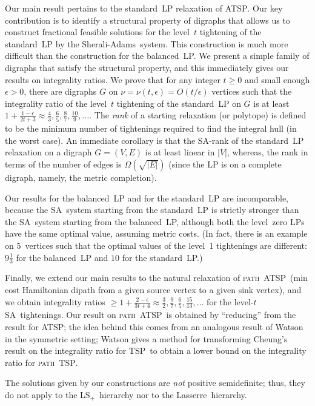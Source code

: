 \documentclass[11pt]{article}
\newcommand{\sa}{\textsf{Sherali-Adams}}
\newcommand{\la}{\textsf{Lasserre}}
\newcommand{\iLSp}{\textsf{LS}$_+$}
\newcommand{\iSA}{\textsf{SA}}
\newcommand{\tsp}{\textsc{TSP}}
\newcommand{\atsp}{\textsc{ATSP}}
\newcommand{\pathtsp}{\textsc{path~TSP}}
\newcommand{\pathatsp}{\textsc{path~ATSP}}
\begin{document}
Our main result pertains to the standard~LP relaxation of \atsp.
Our key contribution is to identify
a structural property of digraphs that
allows us to construct fractional feasible solutions
for the level~$t$ tightening of the standard~LP by the \sa\ system.
This construction is much more difficult than the
construction for the balanced~LP.
We present a simple family of digraphs that
satisfy the structural property, and this immediately
gives our results on integrality ratios.
We prove that for any integer $t\ge0$ and small enough $\epsilon>0$,
there are digraphs $G$ on $\nu=\nu(t,\epsilon)=O(t/\epsilon)$ vertices
such that the integrality ratio of
the level~$t$ tightening of the standard~LP on $G$
is at least $1+\frac{1-\epsilon}{2t+3} \approx \frac43, \frac65,
\frac87, \frac{10}9, \dots$.
The \textit{rank} of a starting relaxation (or polytope)
is defined to be the minimum number of tightenings
required to find the integral hull (in the worst case).
An immediate corollary is that
the \iSA-rank of the standard~LP relaxation on a digraph $G=(V,E)$
is at least linear in $|V|$, whereas,
the rank in terms of the number of edges is $\Omega(\sqrt{|E|})$
(since the LP is on a complete digraph, namely, the metric completion).

Our results for the balanced~LP and for the standard~LP
are incomparable, because
the \iSA\ system starting from the standard~LP
is strictly stronger than
the \iSA\ system starting from the balanced~LP,
although both the level~zero LPs have the
same optimal value, assuming metric costs.
(In fact, there is an example on 5~vertices
\cite[Figure~4.4,~p.60]{paulthesis08} such that
the optimal values of the level~1 tightenings are different:
$9\frac13$ for the balanced~LP and $10$ for the standard~LP.)

Finally, we extend our main results to the natural relaxation of
\pathatsp\ (min cost Hamiltonian dipath from a given source vertex to a
given sink vertex), and
we obtain integrality ratios $\ge 1+\frac{2-\epsilon}{3t+4} \approx
\frac32, \frac97, \frac65, \frac{15}{13}, \dots$ for the level-$t$
\iSA\ tightenings.
Our result on \pathatsp\ is obtained by ``reducing'' from the result
for \atsp; the idea behind this comes from an analogous result of
Watson \cite{watson11} in the symmetric setting; Watson gives a method
for transforming Cheung's \cite{cheung05} result on the integrality
ratio for \tsp\ to obtain a lower bound on the integrality ratio for
\pathtsp.


The solutions given by our constructions are \textit{not}
positive semidefinite;
thus, they do not apply to the \iLSp\ hierarchy
nor to the \la\ hierarchy.
\end{document}
